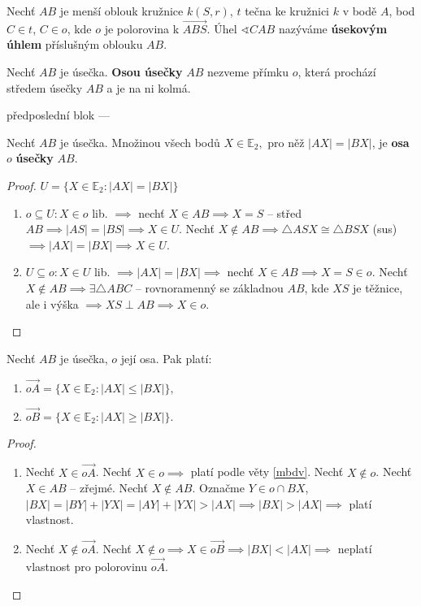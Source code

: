 \begin{definition}
  Nechť $AB$ je menší oblouk kružnice $k(S,r)$, $t$ tečna ke kružnici $k$ v bodě $A$, bod $C\in t$, $C\in o$, kde $o$ je polorovina k $\overrightarrow{ABS}.$ Úhel $\sphericalangle CAB$ nazýváme \textbf{úsekovým úhlem} příslušným oblouku $AB$.
\end{definition}


\begin{definition}
  Nechť $AB$ je úsečka. \textbf{Osou úsečky} $AB$ nezveme přímku $o$, která prochází středem úsečky $AB$ a je na ni kolmá.
\end{definition}


předposlední blok ---
\begin{veta}\label{mbdv}
  Nechť $AB$ je úsečka. Množinou všech bodů $X\in \mathbb E_2,$ pro něž $|AX|=|BX|$, je \textbf{osa} $o$ \textbf{úsečky} $AB$.
\end{veta}

\begin{proof}
  $U=\{ X\in \mathbb E_2: |AX|=|BX| \}$
  \begin{enumerate}[$i.$]
    \item $o \subseteq U: X \in o$ lib. $\implies$ nechť $X\in AB \implies X=S$ -- střed $AB \implies |AS|=|BS| \implies X \in U.$ Nechť $X \notin AB \implies \triangle ASX \cong \triangle BSX$ (sus) $\implies |AX|=|BX| \implies X \in U$.
    \item $U \subseteq o: X \in U$ lib. $\implies |AX|=|BX| \implies$ nechť $X \in AB \implies X=S \in o.$ Nechť $X \notin AB \implies \exists \triangle ABC$ -- rovnoramenný se základnou $AB$, kde $XS$ je těžnice, ale i výška $\implies XS \perp AB \implies X \in o.$ \qedhere
  \end{enumerate}
\end{proof}

\begin{veta}
  Nechť $AB$ je úsečka, $o$ její osa. Pak platí:
  \begin{enumerate}[$i.$]
    \item $\overrightarrow{oA}=\{ X\in \mathbb E_2:|AX|\leq |BX| \},$
    \item $\overrightarrow{oB}=\{ X \in \mathbb E_2 : |AX| \geq |BX| \}.$
  \end{enumerate}
\end{veta}

\begin{proof}
  \begin{enumerate}[$i.$]
    \item Nechť $X\in \overrightarrow{oA}$. Nechť $X\in o\implies$ platí podle věty \ref{mbdv}. Nechť $X\notin o$. Nechť $X\in AB$ -- zřejmé. Nechť $X\notin AB$. Označme $Y\in o \cap BX$, $|BX|=|BY|+|YX|=|AY|+|YX|>|AX|\implies |BX|>|AX|\implies$ platí vlastnost.
    \item Nechť $X\notin \overrightarrow{oA}$. Nechť $X\notin o \implies X\in \overrightarrow{oB}\implies |BX|<|AX|\implies$ neplatí vlastnost pro polorovinu $\overrightarrow{oA}.$ \qedhere
\end{enumerate}
\end{proof}

